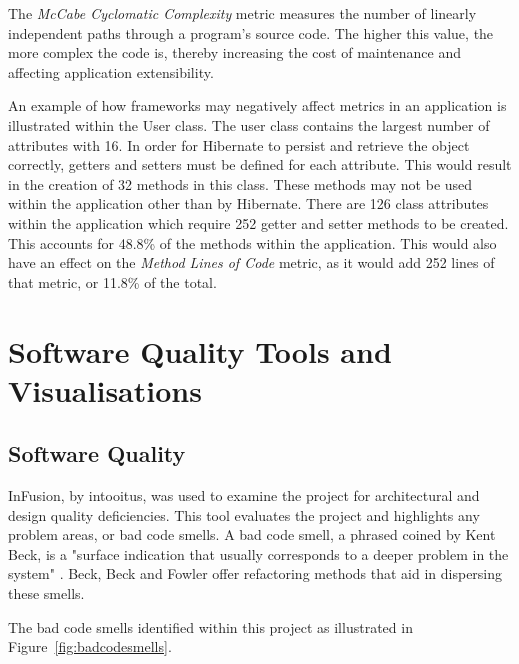 The \textit{McCabe Cyclomatic Complexity} metric measures the number of linearly independent paths through a program's source code. The higher this value, the more complex the code is, thereby increasing the cost of maintenance and affecting application extensibility. 

An example of how frameworks may negatively affect metrics in an application is illustrated within the User class. The user class contains the largest number of attributes with 16. In order for Hibernate to persist and retrieve the object correctly, getters and setters must be defined for each attribute. This would result in the creation of 32 methods in this class. These methods may not be used within the application other than by Hibernate. There are 126 class attributes within the application which require 252 getter and setter methods to be created. This accounts for 48.8\% of the methods within the application. This would also have an effect on the \textit{Method Lines of Code} metric, as it would add 252 lines of that metric, or 11.8\% of the total. 

\section{Software Quality Tools and Visualisations}

\subsection{Software Quality}

InFusion, by intooitus, was used to examine the project for architectural and design quality deficiencies. This tool evaluates the project and highlights any problem areas, or bad code smells. A bad code smell, a phrased coined by Kent Beck, is a "surface indication that usually corresponds to a deeper problem in the system" \parencite{fowler}. Beck, Beck and Fowler offer refactoring methods that aid in dispersing these smells. 

The bad code smells identified within this project as illustrated in Figure~\ref{fig:badcodesmells}.

